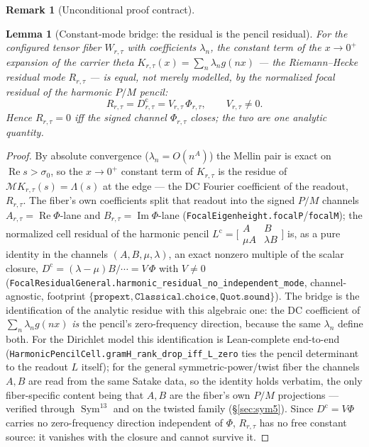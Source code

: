 \documentclass[11pt]{article}
\newtheorem{lemma}[theorem]{Lemma}
\theoremstyle{definition}
\newtheorem{remark}[theorem]{Remark}
\renewcommand{\Re}{\operatorname{Re}}
\newcommand{\Sym}{\operatorname{Sym}}
\begin{document}
\begin{remark}[Unconditional proof contract]
\begin{enumerate}
\begin{lemma}[Constant-mode bridge: the residual is the pencil residual]\label{lem:bridge}
For the configured tensor fiber $W_{r,\tau}$ with coefficients $\lambda_n$, the constant term of the
$x\to0^{+}$ expansion of the carrier theta $K_{r,\tau}(x)=\sum_{n}\lambda_n g(nx)$ --- the Riemann--Hecke
residual mode $R_{r,\tau}$ --- is \emph{equal}, not merely modelled, by the normalized focal residual of the
harmonic $P/M$ pencil:
\[
  R_{r,\tau}=D^{\mathrm c}_{r,\tau}=V_{r,\tau}\,\Phi_{r,\tau},\qquad V_{r,\tau}\neq0 .
\]
Hence $R_{r,\tau}=0$ iff the signed channel $\Phi_{r,\tau}$ closes; the two are one analytic quantity.
\end{lemma}
\begin{proof}
By absolute convergence ($\lambda_n=O(n^{A})$) the Mellin pair is exact on $\Re s>\sigma_0$, so the $x\to0^{+}$
constant term of $K_{r,\tau}$ is the residue of $\mathcal M K_{r,\tau}(s)=\Lambda(s)$ at the edge --- the DC
Fourier coefficient of the readout, $R_{r,\tau}$. The fiber's own coefficients split that readout into the signed
$P/M$ channels $A_{r,\tau}=\operatorname{Re}\Phi$-lane and $B_{r,\tau}=\operatorname{Im}\Phi$-lane
(\texttt{FocalEigenheight.focalP}/\texttt{focalM}); the normalized cell residual of the harmonic pencil
$L^{\mathrm c}=\big[\begin{smallmatrix}A&B\\ \mu A&\lambda B\end{smallmatrix}\big]$ is, as a pure identity in the
channels $(A,B,\mu,\lambda)$, an exact nonzero multiple of the scalar closure,
$D^{\mathrm c}=(\lambda-\mu)B/\!\cdots=V\,\Phi$ with $V\neq0$
(\texttt{FocalResidualGeneral.harmonic\_residual\_no\_independent\_mode}, channel-agnostic, footprint
$\{\texttt{propext},\texttt{Classical.choice},\texttt{Quot.sound}\}$). The bridge is the identification of the
analytic residue with this algebraic one: the DC coefficient of $\sum_n\lambda_n g(nx)$ \emph{is} the pencil's
zero-frequency direction, because the same $\lambda_n$ define both. For the Dirichlet model this identification is
Lean-complete end-to-end (\texttt{HarmonicPencilCell.gramH\_rank\_drop\_iff\_L\_zero} ties the pencil determinant
to the readout $L$ itself); for the general symmetric-power/twist fiber the channels $A,B$ are read from the same
Satake data, so the identity holds verbatim, the only fiber-specific content being that $A,B$ are the fiber's own
$P/M$ projections --- verified through $\Sym^{13}$ and on the twisted family (\S\ref{sec:sym5}). Since
$D^{\mathrm c}=V\Phi$ carries no zero-frequency direction independent of $\Phi$, $R_{r,\tau}$ has no free constant
source: it vanishes with the closure and cannot survive it.
\end{proof}


\end{enumerate}
\end{remark}
\end{document}
